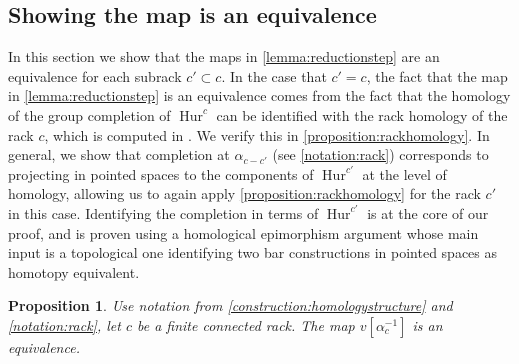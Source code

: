 \documentclass[12 pt]{amsart}
\theoremstyle{plain}
\newtheorem{proposition}[theorem]{Proposition}
\theoremstyle{definition}
\theoremstyle{remark}
\numberwithin{equation}{section}
\DeclareMathOperator\Hur{Hur}
\begin{document}
\subsection{Showing the map is an equivalence}
\label{subsection:equivalence}

In this section we show that the maps in \autoref{lemma:reductionstep} are an
equivalence for each subrack $c'\subset c$. In the case that $c'=c$, the fact
that the map in \autoref{lemma:reductionstep} is an equivalence comes from the fact
that the homology of the group completion of $\Hur^{c}$ can be identified with
the rack homology of the rack $c$, which is computed in \cite{etingof2003rack}.
We verify this in \autoref{proposition:rackhomology}.
In general, we show that completion at $\alpha_{c-c'}$ (see \autoref{notation:rack}) corresponds to projecting in
pointed spaces to the components of $\Hur^{c'}$ at the
level of homology, allowing us to again apply \autoref{proposition:rackhomology} for the rack $c'$ in this case.
Identifying the completion in terms of $\Hur^{c'}$ is at the core of our proof, and is proven using a homological epimorphism argument whose main input is a topological one identifying two bar constructions in pointed spaces as homotopy equivalent.

\begin{proposition}\label{proposition:rackhomology}
	Use notation from \autoref{construction:homologystructure} and
	\autoref{notation:rack}, let $c$ be a finite connected rack.
	The map $v[\alpha_{c}^{-1}]$ is an equivalence.
\end{proposition}
\end{document}
